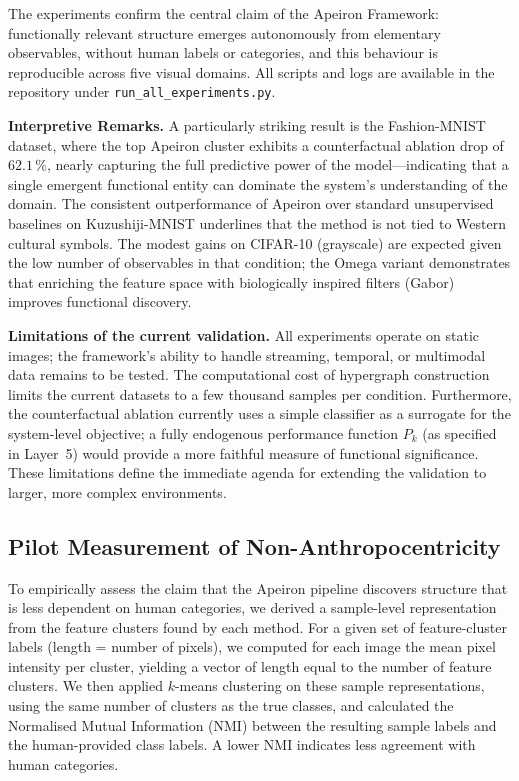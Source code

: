 The experiments confirm the central claim of the Apeiron Framework:
functionally relevant structure emerges autonomously from elementary
observables, without human labels or categories, and this behaviour is
reproducible across five visual domains.  All scripts and logs are
available in the repository under
\texttt{run\_all\_experiments.py}.

\noindent\textbf{Interpretive Remarks.}
A particularly striking result is the Fashion-MNIST dataset, where the top Apeiron cluster exhibits a counterfactual ablation drop of \(62.1\,\%\), nearly capturing the full predictive power of the model---indicating that a single emergent functional entity can dominate the system's understanding of the domain.  The consistent outperformance of Apeiron over standard unsupervised baselines on Kuzushiji-MNIST underlines that the method is not tied to Western cultural symbols.  The modest gains on CIFAR-10 (grayscale) are expected given the low number of observables in that condition; the Omega variant demonstrates that enriching the feature space with biologically inspired filters (Gabor) improves functional discovery.

\noindent\textbf{Limitations of the current validation.}
All experiments operate on static images; the framework's ability to handle streaming, temporal, or multimodal data remains to be tested.  The computational cost of hypergraph construction limits the current datasets to a few thousand samples per condition.  Furthermore, the counterfactual ablation currently uses a simple classifier as a surrogate for the system-level objective; a fully endogenous performance function $P_k$ (as specified in Layer~5) would provide a more faithful measure of functional significance.  These limitations define the immediate agenda for extending the validation to larger, more complex environments.

\subsection{Pilot Measurement of Non-Anthropocentricity}
\label{subsec:non_anthropo_pilot}

To empirically assess the claim that the Apeiron pipeline discovers
structure that is less dependent on human categories, we derived a
sample-level representation from the feature clusters found by each
method.  For a given set of feature-cluster labels (length = number of
pixels), we computed for each image the mean pixel intensity per cluster,
yielding a vector of length equal to the number of feature clusters.
We then applied \(k\)-means clustering on these sample representations,
using the same number of clusters as the true classes, and calculated
the Normalised Mutual Information (NMI) between the resulting sample
labels and the human-provided class labels.  A lower NMI indicates less
agreement with human categories.

